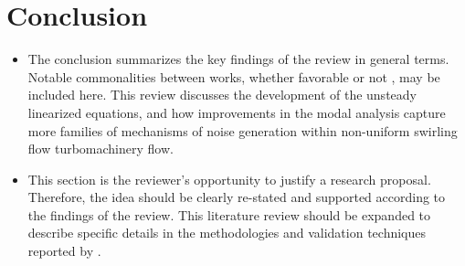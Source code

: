 \section{Conclusion}
\begin{itemize}
    \item The conclusion summarizes 
        the key findings of the review in general terms. Notable commonalities between works, whether favorable or not
        , may be included here.
        \subitem This review discusses the development of the unsteady linearized equations, 
        and how improvements in the modal analysis capture more families of mechanisms of noise generation within non-uniform 
        swirling flow turbomachinery flow. 
    \item This section is the reviewer’s opportunity to justify a research 
        proposal. Therefore, the idea should be clearly re-stated and supported according to the findings of 
        the review.
        \subitem This literature review should be expanded to describe specific details in the methodologies and validation techniques reported by \cite{Kousen1996,Kousen1999,Golubev1996,Golubev1998}. 
\end{itemize}

